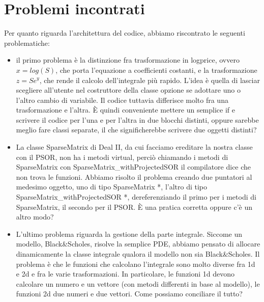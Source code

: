 \documentclass[a4paper,10pt]{article}
\begin{document}
\section{Problemi incontrati}
Per quanto riguarda l'architettura del codice, abbiamo riscontrato le seguenti problematiche:
\begin{itemize}
\item{il primo problema \`e la distinzione fra trasformazione in logprice, ovvero $x=log(S)$, che porta l'equazione a coefficienti costanti, e la trasformazione $z=Se^y$, che rende il calcolo dell'integrale pi\`u rapido. L'idea \`e quella di lasciar scegliere all'utente nel costruttore della classe opzione se adottare uno o l'altro cambio di variabile. Il codice tuttavia differisce molto fra una trasformazione e l'altra. \`E quindi conveniente mettere un semplice \textsf{if} e scrivere il codice per l'una e per l'altra in due blocchi distinti, oppure sarebbe meglio fare classi separate, il che significherebbe scrivere due oggetti distinti?}
\item{La classe \textsf{SparseMatrix} di Deal II, da cui facciamo ereditare la nostra classe con il PSOR, non ha i metodi \textsf{virtual}, perci\`o chiamando i metodi di \textsf{SparseMatrix} con \textsf{SparseMatrix\_withProjectedSOR} il compilatore dice che non trova le funzioni. Abbiamo risolto il problema creando due puntatori al medesimo oggetto, uno di tipo \textsf{SparseMatrix *}, l'altro di tipo \textsf{SparseMatrix\_withProjectedSOR *}, dereferenziando il primo per i metodi di \textsf{SparseMatrix}, il secondo per il PSOR. \`E una pratica corretta oppure c'\`e un altro modo?}
\item{L'ultimo problema riguarda la gestione della parte integrale. Siccome un modello, Black\&Scholes, risolve la semplice PDE, abbiamo pensato di allocare dinamicamente la classe integrale qualora il modello non sia Black\&Scholes. Il problema \`e che le funzioni che calcolano l'integrale sono molto diverse fra 1d e 2d e fra le varie trasformazioni. In particolare, le funzioni 1d devono calcolare un numero e un vettore (con metodi differenti in base al modello), le funzioni 2d due numeri e due vettori. Come possiamo conciliare il tutto?}
\end{itemize}
\end{document}
